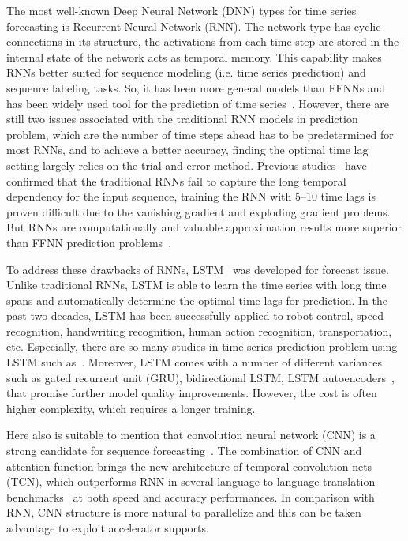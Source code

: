 \documentclass[11pt,twoside]{article}
\begin{document}
\begin{multicols}{2}
The most well-known Deep Neural Network (DNN) types for time series forecasting is Recurrent Neural Network (RNN). The network type has cyclic connections in its structure, the activations from each time step are stored in the internal state of the network acts as temporal memory. This capability makes RNNs better suited for sequence modeling (i.e. time series prediction) and sequence labeling tasks. So, it has been more general models than FFNNs and has been widely used tool for the prediction of time series~\citep{ref_connor, ref_saad, ref_petrosian, ref_pollastri, ref_han}. However, there are still two issues associated with the traditional RNN models in prediction problem, which are the number of time steps ahead has to be predetermined for most RNNs, and to achieve a better accuracy, finding the optimal time lag setting largely relies on the trial-and-error method. Previous studies~\citep{ref_hochreiter} have confirmed that the traditional RNNs fail to capture the long temporal dependency for the input sequence, training the RNN with 5–10 time lags is proven difficult due to the vanishing gradient and exploding gradient problems. But RNNs are computationally and valuable approximation results more superior than FFNN prediction problems~\citep{ref_gency, ref_kalaitzakis, ref_saha}. 

To address these drawbacks of RNNs, LSTM~\citep{ref_hochreiter} was developed for forecast issue. Unlike traditional RNNs, LSTM is able to learn the time series with long time spans and automatically determine the optimal time lags for prediction. In the past two decades, LSTM has been successfully applied to robot control, speed recognition, handwriting recognition, human action recognition, transportation, etc. Especially, there are so many studies in time series prediction problem using LSTM such as~\citep{ref_xiaolei, ref_titan, ref_zhao, ref_azzouni, ref_nhuan}. Moreover, LSTM comes with a number of different variances such as gated recurrent unit (GRU), bidirectional LSTM, LSTM autoencoders~\citep{vaswani2017attention, hollis2018comparison}, that promise further model quality improvements. However, the cost is often higher complexity, which requires a longer training.

Here also is suitable to mention that convolution neural network (CNN) is a strong candidate for sequence forecasting~\citep{bai2018empirical, shih2018temporal}. The combination of CNN and attention function brings the new architecture of temporal convolution nets (TCN), which outperforms RNN in several language-to-language translation benchmarks~\citep{tcn2018} at both speed and accuracy performances. In comparison with RNN, CNN structure is more natural to parallelize and this can be taken advantage to exploit accelerator supports. 


\end{multicols}
\end{document}
